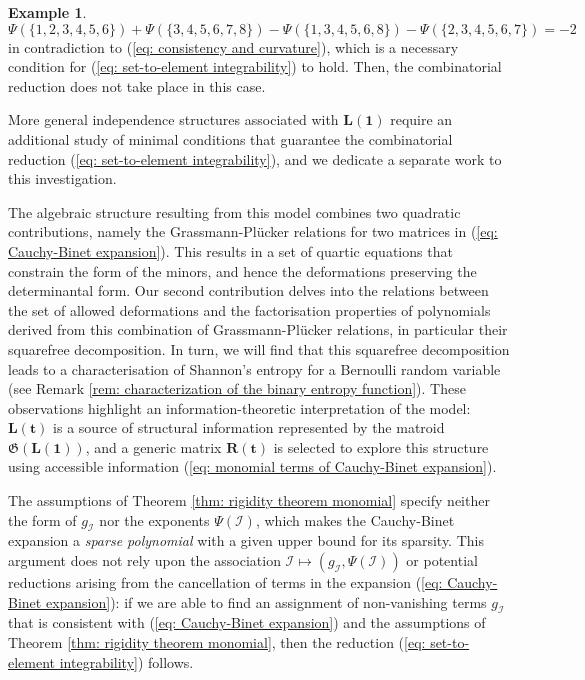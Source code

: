 \documentclass[10pt]{article}
\theoremstyle{remark}%
\theoremstyle{definition}%
\newtheorem{example}{Example}%
\begin{document}
\begin{example}
\begin{equation}
    \Psi\left(\{1,2,3,4,5,6\}\right) + \Psi\left(\{3,4,5,6,7,8\}\right)
    - \Psi\left(\{1,3,4,5,6,8\}\right) - \Psi\left(\{2,3,4,5,6,7\}\right) = -2 
\end{equation}
in contradiction to (\ref{eq: consistency and curvature}), which is a necessary condition for (\ref{eq: set-to-element integrability}) to hold. Then, the combinatorial reduction does not take place in this case. 
\end{example}
More general independence structures associated with $\mathbf{L}(\mathbf{1})$ require an additional study of minimal conditions that guarantee the combinatorial reduction (\ref{eq: set-to-element integrability}), and we dedicate a separate work to this investigation.

The algebraic structure resulting from this model combines two quadratic contributions, namely the Grassmann-Pl\"{u}cker relations for two matrices in (\ref{eq: Cauchy-Binet expansion}). This results in a set of quartic equations that constrain the form of the minors, and hence the deformations preserving the determinantal form. Our second contribution delves into the relations between the set of allowed deformations and the factorisation properties of polynomials derived from this combination of Grassmann-Pl\"{u}cker relations, in particular their squarefree decomposition. In turn, we will find that this squarefree decomposition leads to a characterisation of Shannon's entropy for a Bernoulli random variable (see Remark \ref{rem: characterization of the binary entropy function}). These observations highlight an information-theoretic interpretation of the model: $\mathbf{L}(\mathbf{t})$ is a source of structural information represented by the matroid $\mathfrak{G}(\mathbf{L}(\mathbf{1}))$, and a generic matrix $\mathbf{R}(\mathbf{t})$ is selected to explore this structure using accessible information (\ref{eq: monomial terms of Cauchy-Binet expansion}).   

The assumptions of Theorem \ref{thm: rigidity theorem monomial} specify neither the form of $g_{\mathcal{I}}$ nor the exponents $\Psi(\mathcal{I})$, which makes the Cauchy-Binet expansion a \emph{sparse polynomial} \citep{Khovanskii1991} with a given upper bound for its sparsity. This argument does not rely upon the association $\mathcal{I}\mapsto(g_{\mathcal{I}},\Psi(\mathcal{I}))$ or potential reductions arising from the cancellation of terms in the expansion (\ref{eq: Cauchy-Binet expansion}): if we are able to find an assignment of non-vanishing terms $g_{\mathcal{I}}$ that is consistent with (\ref{eq: Cauchy-Binet expansion}) and 
the assumptions of Theorem \ref{thm: rigidity theorem monomial}, then the reduction (\ref{eq: set-to-element integrability}) follows. 
\end{document}
